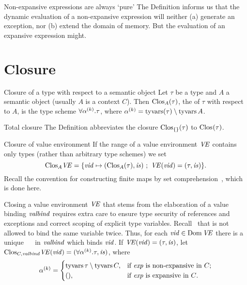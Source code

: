\begin{clause}{Non-expansive expressions are always `pure'}
The Definition informs us that the dynamic evaluation of a non-expansive
expression will neither (a) generate an exception, nor (b) extend the
domain of memory. But the evaluation of an expansive expression might.
\end{clause}

\section{Closure}\label{sec:closure}

\begin{definition}{Closure of a type with respect to a semantic object}
Let $\tau$ be a type and $A$ a semantic object (usually $A$ is a context
$C$). Then ${\rm Clos}_{A}(\tau)$, the  of $\tau$ with respect
to $A$, is the type scheme $\forall\mbox{$\alpha^{(k)}$}.\tau$, where
$\mbox{$\alpha^{(k)}$}=\mathop{\rm tyvars}\nolimits(\tau)\setminus\mathop{\rm tyvars}\nolimits A$.
\end{definition}

\begin{definition}{Total closure}
The Definition abbreviates the  closure ${\rm Clos}_{\{\}}(\tau)$ to
${\rm Clos}_{}(\tau)$.
\end{definition}

\begin{clause}{Closure of value environment}\label{defn:closing-value-environment}
If the range of a value environment $\textit{V\kern-.05emE\/}$ contains only types (rather
than arbitrary type schemes) we set
\begin{equation*}
\cl{A}{\VE}=\{\vid\mapsto(\cl{A}{(\tau)},\is)\ ;\ \VE(\vid)=(\tau,\is)\}.
\end{equation*}
Recall the convention for constructing finite maps by set
comprehension~,
which is done here.

Closing a value environment $\textit{V\kern-.05emE\/}$ that stems from
the elaboration of a value binding $\textit{valbind\/}$ requires extra
care to ensure type security of references and exceptions and correct
scoping of explicit type variables.
Recall~ that \hyperref[grammar:valbind]{\valbind} is not allowed to bind the
same variable twice. Thus, for each $\textit{vid\/}\in\mathop{\rm Dom}\nolimits\textit{V\kern-.05emE\/}$ 
there is a unique \mbox{\pat\ \ml{=} \exp}
in $\textit{valbind\/}$ which binds $\textit{vid\/}$. If $\textit{V\kern-.05emE\/}(\textit{vid\/})=(\tau,\textit{is\/})$, let
${\rm Clos}_{C,\textit{valbind\/}}\textit{V\kern-.05emE\/}(\textit{vid\/})=(\forall\mbox{$\alpha^{(k)}$}.\tau,\textit{is\/})$, where
\begin{equation*}
  \mbox{$\alpha^{(k)}$}=\begin{cases}
  \mathop{\rm tyvars}\nolimits\tau\setminus\mathop{\rm tyvars}\nolimits C,&\mbox{if $\textit{exp\/}$ is non-expansive in $C$};\\
               (),&\mbox{if $\textit{exp\/}$ is expansive in $C$.}
  \end{cases}
\end{equation*}
\end{clause}

